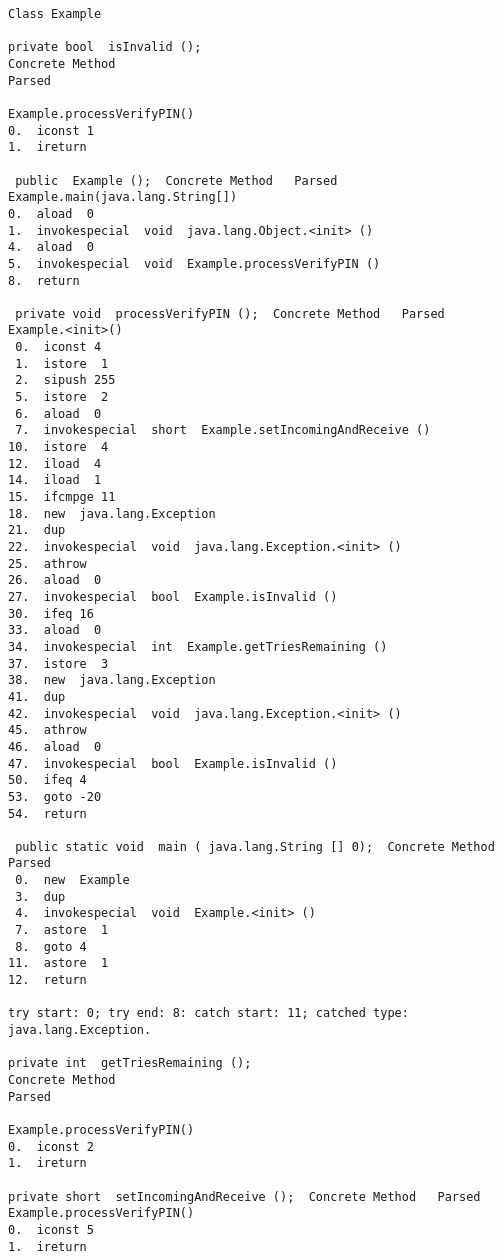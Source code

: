 \begin{lstlisting}[caption={Java bytecode example of the code duplication countermeasure},label={lst:exampleBytecode}]
Class Example

private bool  isInvalid ();  
Concrete Method
Parsed     

Example.processVerifyPIN()    
0.  iconst 1
1.  ireturn

 public  Example ();  Concrete Method   Parsed      Example.main(java.lang.String[])    
0.  aload  0
1.  invokespecial  void  java.lang.Object.<init> ()
4.  aload  0
5.  invokespecial  void  Example.processVerifyPIN ()
8.  return

 private void  processVerifyPIN ();  Concrete Method   Parsed      Example.<init>()    
 0.  iconst 4
 1.  istore  1
 2.  sipush 255
 5.  istore  2
 6.  aload  0
 7.  invokespecial  short  Example.setIncomingAndReceive ()
10.  istore  4
12.  iload  4
14.  iload  1
15.  ifcmpge 11
18.  new  java.lang.Exception
21.  dup
22.  invokespecial  void  java.lang.Exception.<init> ()
25.  athrow
26.  aload  0
27.  invokespecial  bool  Example.isInvalid ()
30.  ifeq 16
33.  aload  0
34.  invokespecial  int  Example.getTriesRemaining ()
37.  istore  3
38.  new  java.lang.Exception
41.  dup
42.  invokespecial  void  java.lang.Exception.<init> ()
45.  athrow
46.  aload  0
47.  invokespecial  bool  Example.isInvalid ()
50.  ifeq 4
53.  goto -20
54.  return

 public static void  main ( java.lang.String [] 0);  Concrete Method   Parsed  
 0.  new  Example
 3.  dup
 4.  invokespecial  void  Example.<init> ()
 7.  astore  1
 8.  goto 4
11.  astore  1
12.  return

try start: 0; try end: 8: catch start: 11; catched type: java.lang.Exception.

private int  getTriesRemaining (); 
Concrete Method   
Parsed      

Example.processVerifyPIN()    
0.  iconst 2
1.  ireturn

private short  setIncomingAndReceive ();  Concrete Method   Parsed      Example.processVerifyPIN()    
0.  iconst 5
1.  ireturn

\end{lstlisting}

